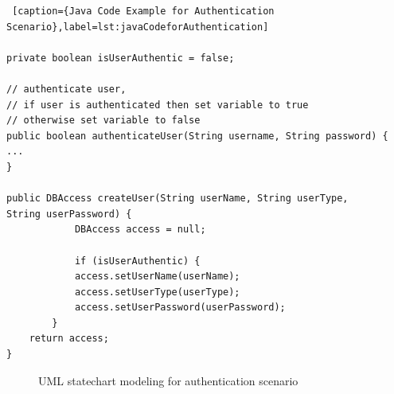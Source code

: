 \begin{lstlisting} [caption={Java Code Example for Authentication Scenario},label=lst:javaCodeforAuthentication]

private boolean isUserAuthentic = false;

// authenticate user,
// if user is authenticated then set variable to true
// otherwise set variable to false
public boolean authenticateUser(String username, String password) {
...
}

public DBAccess createUser(String userName, String userType,
String userPassword) {
			DBAccess access = null;
			
			if (isUserAuthentic) {
			access.setUserName(userName);
			access.setUserType(userType);
			access.setUserPassword(userPassword);
		}
	return access;
}
\end{lstlisting}

\begin{figure}[htbp]
	\centering
	\label{fig:authentication_scenario}
	\caption{UML statechart modeling for authentication scenario}
\end{figure}


